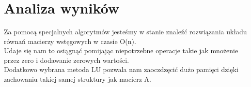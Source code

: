 \documentclass{article}
\begin{document}
\section{Analiza wyników}
\paragraph{}
Za pomocą specjalnych algorytmów jesteśmy w stanie znaleźć rozwiązania układu równań macierzy wstęgowych w czasie O(n).\\
Udaje się nam to osiągnąć pomijając niepotrzebne operacje takie jak mnożenie przez zero i  dodawanie zerowych wartości. \\
Dodatkowo wybrana metoda LU pozwala nam zaoczdzęcić dużo pamięci dzięki zachowaniu takiej samej struktury jak macierz A. \\
\end{document}

